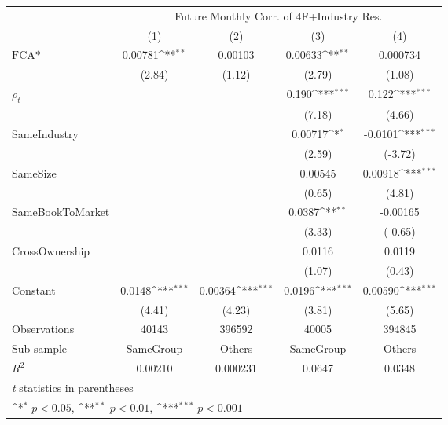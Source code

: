 {
\def\sym#1{\ifmmode^{#1}\else\(^{#1}\)\fi}
\begin{tabular}{l*{4}{c}}
\hline\hline
                &\multicolumn{4}{c}{Future Monthly Corr. of 4F+Industry Res.}               \\\cmidrule(lr){2-5}
                &\multicolumn{1}{c}{(1)}         &\multicolumn{1}{c}{(2)}         &\multicolumn{1}{c}{(3)}         &\multicolumn{1}{c}{(4)}         \\
\hline
$ \text{FCA*} $ &  0.00781\sym{**} &  0.00103         &  0.00633\sym{**} & 0.000734         \\
                &   (2.84)         &   (1.12)         &   (2.79)         &   (1.08)         \\
[1em]
 $ {\rho_t} $   &                  &                  &    0.190\sym{***}&    0.122\sym{***}\\
                &                  &                  &   (7.18)         &   (4.66)         \\
[1em]
SameIndustry    &                  &                  &  0.00717\sym{*}  &  -0.0101\sym{***}\\
                &                  &                  &   (2.59)         &  (-3.72)         \\
[1em]
SameSize        &                  &                  &  0.00545         &  0.00918\sym{***}\\
                &                  &                  &   (0.65)         &   (4.81)         \\
[1em]
SameBookToMarket&                  &                  &   0.0387\sym{**} & -0.00165         \\
                &                  &                  &   (3.33)         &  (-0.65)         \\
[1em]
CrossOwnership  &                  &                  &   0.0116         &   0.0119         \\
                &                  &                  &   (1.07)         &   (0.43)         \\
[1em]
Constant        &   0.0148\sym{***}&  0.00364\sym{***}&   0.0196\sym{***}&  0.00590\sym{***}\\
                &   (4.41)         &   (4.23)         &   (3.81)         &   (5.65)         \\
\hline
Observations    &    40143         &   396592         &    40005         &   394845         \\
Sub-sample      &SameGroup         &   Others         &SameGroup         &   Others         \\
$ R^2 $         &  0.00210         & 0.000231         &   0.0647         &   0.0348         \\
\hline\hline
\multicolumn{5}{l}{\footnotesize \textit{t} statistics in parentheses}\\
\multicolumn{5}{l}{\footnotesize \sym{*} \(p<0.05\), \sym{**} \(p<0.01\), \sym{***} \(p<0.001\)}\\
\end{tabular}
}
